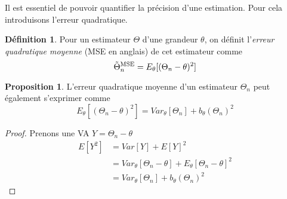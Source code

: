 \documentclass[a4paper,12pt]{report}
\theoremstyle{definition}
\renewcommand{\(}{\left(}
\renewcommand{\)}{\right)}
\renewcommand{\t}{\text}
\renewcommand{\d}{\textit}
\newtheorem{defn}[thm]{Définition}
\newtheorem{prop}[thm]{Proposition}
\begin{document}
        Il est essentiel de pouvoir quantifier la précision d'une estimation. Pour cela introduisons l'erreur quadratique.
        
        \begin{leftbar}
        \begin{defn}
            Pour un estimateur $\Theta$ d'une grandeur $\theta$, on définit l'\d{erreur quadratique moyenne} (MSE en anglais) de cet estimateur comme
            $$\Tilde{\Theta}_n^{\t{MSE}} = E_\theta[(\Theta_n-\theta)^2]$$
        \end{defn}
        \end{leftbar}
        
        \begin{leftbar}
        \begin{prop}
            L'erreur quadratique moyenne d'un estimateur $\Theta_n$ peut également s'exprimer comme 
            $$E_\theta[(\Theta_n-\theta)^2] = Var_\theta[\Theta_n]+b_\theta(\Theta_n)^2$$
        \end{prop}
        \end{leftbar}
        
        \begin{proof} Prenons une VA $Y=\Theta_n-\theta$
            \begin{align*}
                E[Y^2] &= Var[Y] + E[Y]^2 \\
                &= Var_\theta[\Theta_n-\theta] + E_\theta[\Theta_n-\theta]^2 \\
                &= Var_\theta[\Theta_n]+b_\theta(\Theta_n)^2
            \end{align*}
        \end{proof}
    
\end{document}

